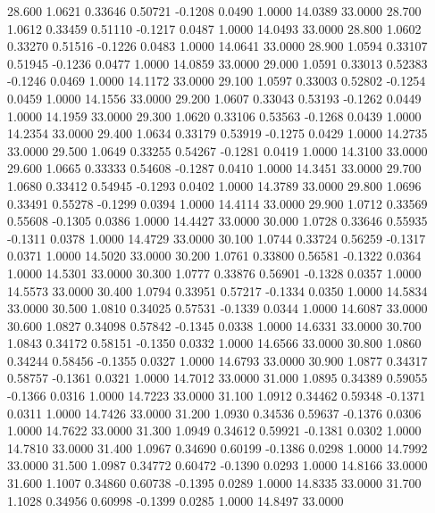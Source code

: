  28.600   1.0621   0.33646   0.50721  -0.1208   0.0490   1.0000  14.0389  33.0000
  28.700   1.0612   0.33459   0.51110  -0.1217   0.0487   1.0000  14.0493  33.0000
  28.800   1.0602   0.33270   0.51516  -0.1226   0.0483   1.0000  14.0641  33.0000
  28.900   1.0594   0.33107   0.51945  -0.1236   0.0477   1.0000  14.0859  33.0000
  29.000   1.0591   0.33013   0.52383  -0.1246   0.0469   1.0000  14.1172  33.0000
  29.100   1.0597   0.33003   0.52802  -0.1254   0.0459   1.0000  14.1556  33.0000
  29.200   1.0607   0.33043   0.53193  -0.1262   0.0449   1.0000  14.1959  33.0000
  29.300   1.0620   0.33106   0.53563  -0.1268   0.0439   1.0000  14.2354  33.0000
  29.400   1.0634   0.33179   0.53919  -0.1275   0.0429   1.0000  14.2735  33.0000
  29.500   1.0649   0.33255   0.54267  -0.1281   0.0419   1.0000  14.3100  33.0000
  29.600   1.0665   0.33333   0.54608  -0.1287   0.0410   1.0000  14.3451  33.0000
  29.700   1.0680   0.33412   0.54945  -0.1293   0.0402   1.0000  14.3789  33.0000
  29.800   1.0696   0.33491   0.55278  -0.1299   0.0394   1.0000  14.4114  33.0000
  29.900   1.0712   0.33569   0.55608  -0.1305   0.0386   1.0000  14.4427  33.0000
  30.000   1.0728   0.33646   0.55935  -0.1311   0.0378   1.0000  14.4729  33.0000
  30.100   1.0744   0.33724   0.56259  -0.1317   0.0371   1.0000  14.5020  33.0000
  30.200   1.0761   0.33800   0.56581  -0.1322   0.0364   1.0000  14.5301  33.0000
  30.300   1.0777   0.33876   0.56901  -0.1328   0.0357   1.0000  14.5573  33.0000
  30.400   1.0794   0.33951   0.57217  -0.1334   0.0350   1.0000  14.5834  33.0000
  30.500   1.0810   0.34025   0.57531  -0.1339   0.0344   1.0000  14.6087  33.0000
  30.600   1.0827   0.34098   0.57842  -0.1345   0.0338   1.0000  14.6331  33.0000
  30.700   1.0843   0.34172   0.58151  -0.1350   0.0332   1.0000  14.6566  33.0000
  30.800   1.0860   0.34244   0.58456  -0.1355   0.0327   1.0000  14.6793  33.0000
  30.900   1.0877   0.34317   0.58757  -0.1361   0.0321   1.0000  14.7012  33.0000
  31.000   1.0895   0.34389   0.59055  -0.1366   0.0316   1.0000  14.7223  33.0000
  31.100   1.0912   0.34462   0.59348  -0.1371   0.0311   1.0000  14.7426  33.0000
  31.200   1.0930   0.34536   0.59637  -0.1376   0.0306   1.0000  14.7622  33.0000
  31.300   1.0949   0.34612   0.59921  -0.1381   0.0302   1.0000  14.7810  33.0000
  31.400   1.0967   0.34690   0.60199  -0.1386   0.0298   1.0000  14.7992  33.0000
  31.500   1.0987   0.34772   0.60472  -0.1390   0.0293   1.0000  14.8166  33.0000
  31.600   1.1007   0.34860   0.60738  -0.1395   0.0289   1.0000  14.8335  33.0000
  31.700   1.1028   0.34956   0.60998  -0.1399   0.0285   1.0000  14.8497  33.0000
